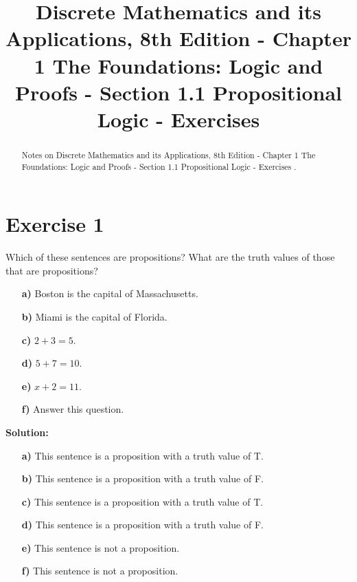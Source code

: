 \documentclass{Axon}
\title{Discrete Mathematics and its Applications, 8th Edition - Chapter 1 The Foundations: Logic and Proofs - Section 1.1 Propositional Logic - Exercises}
\begin{document}
\maketitle
\makeauthor
\begin{abstract}
Notes on Discrete Mathematics and its Applications, 8th Edition - Chapter 1 The Foundations: Logic and Proofs - Section 1.1 Propositional Logic - Exercises \cite{Rosen}.
\end{abstract}
\section*{Exercise 1}
Which of these sentences are propositions? What are the truth values of those that are propositions?

\begin{enumerate}
    \item[\textbf{a)}] Boston is the capital of Massachusetts.
    \item[\textbf{b)}] Miami is the capital of Florida.
    \item[\textbf{c)}] \(2 + 3 = 5\).
    \item[\textbf{d)}] \(5 + 7 = 10\).
    \item[\textbf{e)}] \(x + 2 = 11\).
    \item[\textbf{f)}] Answer this question.
\end{enumerate}

\noindent
\textbf{Solution:}
\begin{enumerate}
    \item[\textbf{a)}] This sentence is a proposition with a truth value of T.
    \item[\textbf{b)}] This sentence is a proposition with a truth value of F.
    \item[\textbf{c)}] This sentence is a proposition with a truth value of T.
    \item[\textbf{d)}] This sentence is a proposition with a truth value of F.
    \item[\textbf{e)}] This sentence is not a proposition.
    \item[\textbf{f)}] This sentence is not a proposition.
\end{enumerate}
\end{document}
